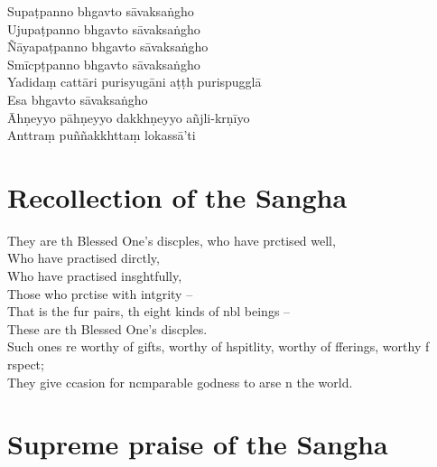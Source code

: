 Supaṭpanno bhgavto sāvaksaṅgho\\
Ujupaṭpanno bhgavto sāvaksaṅgho\\
Ñāyapaṭpanno bhgavto sāvaksaṅgho\\
Smīcpṭpanno bhgavto sāvaksaṅgho\\
Yadidaṃ cattāri purisyugāni aṭṭh purispugglā\\
Esa bhgavto sāvaksaṅgho\\
Āhṇeyyo pāhṇeyyo dakkhṇeyyo añjli-krṇīyo\\
Anttraṃ puññakkhttaṃ lokassā'ti

\chapter{Recollection of the Sangha}

\begin{leader}
\end{leader}

They are th Blessed One's discples, who have prctised well,\\
Who have practised dirctly,\\
Who have practised insghtfully,\\
Those who prctise with intgrity --\\
That is the fur pairs, th eight kinds of nbl beings --\\
These are th Blessed One's discples.\\
Such ones re worthy of gifts, worthy of hspitlity, worthy of fferings, worthy f rspect;\\
They give ccasion for ncmparable godness to arse n the world.

\chapter{Supreme praise of the Sangha}

\begin{leader}
\end{leader}


